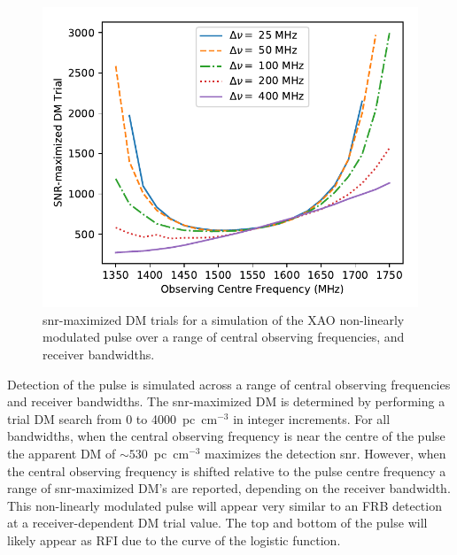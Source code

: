\documentclass[a4paper,fleqn,usenatbib]{mnras}
\begin{document}
\begin{figure}
    \includegraphics[width=1.0\linewidth]{figures/simulatedRADARdm.pdf}
    \caption{\gls{snr}-maximized DM trials for a simulation of the XAO
    non-linearly modulated pulse over a range of central observing frequencies,
    and receiver bandwidths.
    }
    \label{fig:xao_simulated_dm}
\end{figure}

Detection of the pulse is simulated across a range of central observing
frequencies and receiver bandwidths. The \gls{snr}-maximized DM is determined by
performing a trial DM search from 0 to 4000~pc~cm$^{-3}$ in integer increments.
For all bandwidths, when the central observing frequency is near the centre of
the pulse the apparent DM of $\sim530$~pc~cm$^{-3}$ maximizes the detection
\gls{snr}. However, when the central observing frequency is shifted relative to
the pulse centre frequency a range of \gls{snr}-maximized DM's are reported,
depending on the receiver bandwidth. This non-linearly modulated pulse will
appear very similar to an FRB detection at a receiver-dependent DM trial value.
The top and bottom of the pulse will likely appear as RFI due to the curve of
the logistic function.

\end{document}
